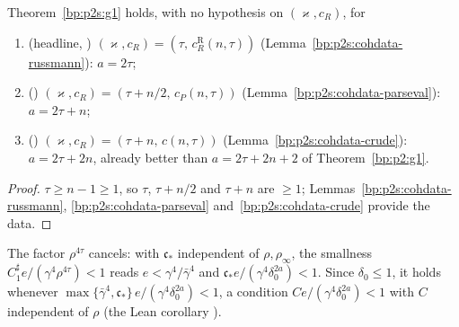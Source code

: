 \begin{corollary}\label{bp:p2s:g1-instances}
Theorem~\ref{bp:p2s:g1} holds, with no hypothesis on $(\varkappa,c_R)$, for
\begin{enumerate}[label=(\alph*)]
\item (headline, ) $(\varkappa,c_R)=(\tau,\,c_R^{\mathrm R}(n,\tau))$ (Lemma~\ref{bp:p2s:cohdata-russmann}): $a=2\tau$;
\item () $(\varkappa,c_R)=(\tau+n/2,\,c_P(n,\tau))$ (Lemma~\ref{bp:p2s:cohdata-parseval}): $a=2\tau+n$;
\item () $(\varkappa,c_R)=(\tau+n,\,c(n,\tau))$ (Lemma~\ref{bp:p2s:cohdata-crude}): $a=2\tau+2n$, already better
  than $a=2\tau+2n+2$ of Theorem~\ref{bp:p2:g1}.
\end{enumerate}
\end{corollary}

\begin{proof}
\label{step:p2s:inst}
$\tau\ge n-1\ge1$, so $\tau$, $\tau+n/2$ and $\tau+n$ are $\ge1$; Lemmas~\ref{bp:p2s:cohdata-russmann}, \ref{bp:p2s:cohdata-parseval}
and~\ref{bp:p2s:cohdata-crude} provide the data.
\end{proof}

\begin{remark}\label{bp:p2s:uniform}
The factor $\rho^{4\tau}$ cancels: with $\mathfrak c_*$ independent of $\rho,\rho_\infty$, the smallness
$C_1^\sharp e/(\gamma^4\rho^{4\tau})<1$ reads $e<\gamma^4/\bar\gamma^4$ and $\mathfrak c_*e/(\gamma^4\delta_0^{2a})<1$. Since $\delta_0\le1$,
it holds whenever $\max\{\bar\gamma^4,\mathfrak c_*\}\,e/(\gamma^4\delta_0^{2a})<1$, a condition $Ce/(\gamma^4\delta_0^{2a})<1$ with $C$ independent of
$\rho$ (the Lean corollary ).
\end{remark}

